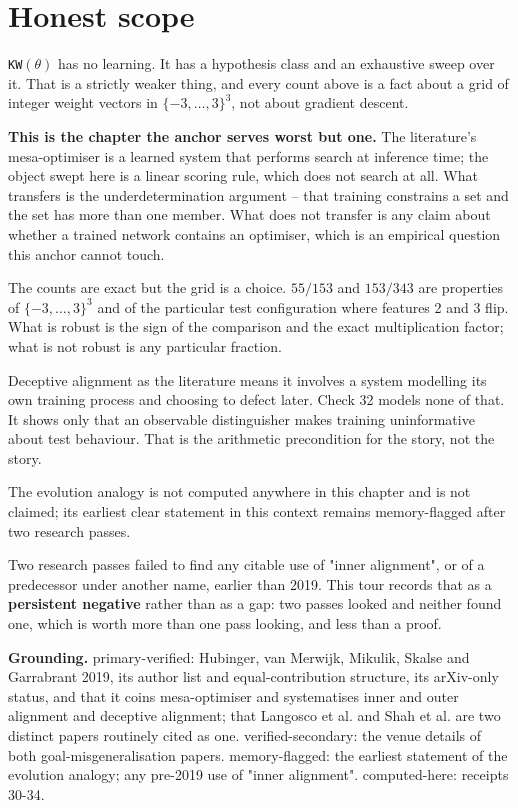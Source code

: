 \section*{Honest scope}

\texttt{KW}$(\theta)$ has no learning. It has a hypothesis class and an exhaustive sweep over it. That is a strictly weaker thing, and every count above is a fact about a grid of integer weight vectors in $\{-3,\dots,3\}^3$, not about gradient descent.

\textbf{This is the chapter the anchor serves worst but one.} The literature's mesa-optimiser is a learned system that performs search at inference time; the object swept here is a linear scoring rule, which does not search at all. What transfers is the underdetermination argument -- that training constrains a set and the set has more than one member. What does not transfer is any claim about whether a trained network contains an optimiser, which is an empirical question this anchor cannot touch.

The counts are exact but the grid is a choice. $55/153$ and $153/343$ are properties of $\{-3,\dots,3\}^3$ and of the particular test configuration where features 2 and 3 flip. What is robust is the sign of the comparison and the exact multiplication factor; what is not robust is any particular fraction.

Deceptive alignment as the literature means it involves a system modelling its own training process and choosing to defect later. Check 32 models none of that. It shows only that an observable distinguisher makes training uninformative about test behaviour. That is the arithmetic precondition for the story, not the story.

The evolution analogy is not computed anywhere in this chapter and is not claimed; its earliest clear statement in this context remains memory-flagged after two research passes.

Two research passes failed to find any citable use of "inner alignment", or of a predecessor under another name, earlier than 2019. This tour records that as a \textbf{persistent negative} rather than as a gap: two passes looked and neither found one, which is worth more than one pass looking, and less than a proof.

\textbf{Grounding.} primary-verified: Hubinger, van Merwijk, Mikulik, Skalse and Garrabrant 2019, its author list and equal-contribution structure, its arXiv-only status, and that it coins mesa-optimiser and systematises inner and outer alignment and deceptive alignment; that Langosco et al. and Shah et al. are two distinct papers routinely cited as one. verified-secondary: the venue details of both goal-misgeneralisation papers. memory-flagged: the earliest statement of the evolution analogy; any pre-2019 use of "inner alignment". computed-here: receipts 30-34.

